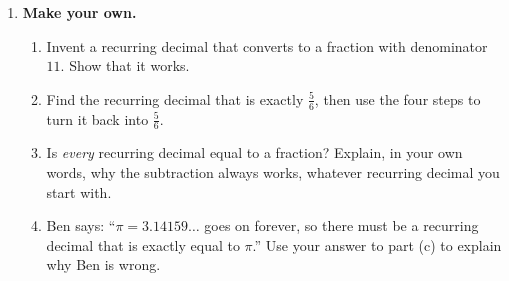 \documentclass[12pt,a4paper]{article}
\begin{document}
\begin{enumerate}[resume]
\begin{minipage}[t]{0.58\linewidth}
\begin{enumerate}
        \vspace{6em}
  \item Use the four steps on $0.\dot{2}8571\dot{4}$ to turn it back into a
        fraction, and check that it agrees with your answer to part (a).

        \vspace{7em}
\end{enumerate}
\end{minipage}\hfill
\begin{minipage}[t]{0.38\linewidth}
\centering
{}
\end{minipage}

\newpage

\item \textbf{Make your own.}
\begin{enumerate}
  \item Invent a recurring decimal that converts to a fraction with
        denominator $11$. Show that it works.

        \vspace{10em}
  \item Find the recurring decimal that is exactly $\frac{5}{6}$, then use
        the four steps to turn it back into $\frac{5}{6}$.

        \vspace{10em}
  \item Is \emph{every} recurring decimal equal to a fraction? Explain, in
        your own words, why the subtraction always works, whatever recurring
        decimal you start with.

        \vspace{10em}
  \item Ben says: ``$\pi=3.14159\ldots$ goes on forever, so there must be a
        recurring decimal that is exactly equal to $\pi$.'' Use your answer to
        part (c) to explain why Ben is wrong.

        \vspace{10em}
\end{enumerate}

\end{enumerate}
\end{document}
